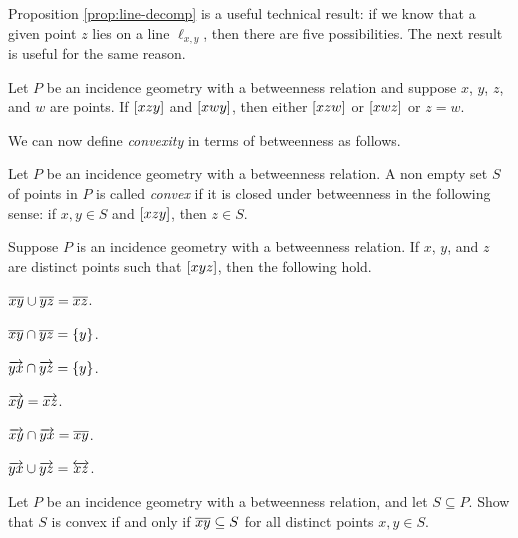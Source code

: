 Proposition \ref{prop:line-decomp} is a useful technical result: if we know that a given point \(z\) lies on a line \(\ell_{x,y}\), then there are five possibilities.
The next result is useful for the same reason.

\begin{prop}
Let \(P\) be an incidence geometry with a betweenness relation and suppose \(x\), \(y\), \(z\), and \(w\) are points.
If \([ x z y ]\) and \([ x w y ]\), then either \([ x z w ]\) or \([ x w z ]\) or \(z = w\).
\end{prop}

We can now define \emph{convexity} in terms of betweenness as follows.

\begin{dfn}[Convexity]
Let \(P\) be an incidence geometry with a betweenness relation.
A non empty set \(S\) of points in \(P\) is called \emph{convex} if it is closed under betweenness in the following sense: if \(x,y \in S\) and \([ x z y ]\), then \(z \in S\).
\end{dfn}



\Exercises%

\begin{exercise}
Suppose \(P\) is an incidence geometry with a betweenness relation.
If \(x\), \(y\), and \(z\) are distinct points such that \([ x y z ]\), then the following hold.
\begin{proplist}
\item \(\overline{xy} \cup \overline{yz} = \overline{xz}\).
\item \(\overline{xy} \cap \overline{yz} = \{y\}\).
\item \(\overrightarrow{yx} \cap \overrightarrow{yz} = \{y\}\).
\item \(\overrightarrow{xy} = \overrightarrow{xz}\).
\item \(\overrightarrow{xy} \cap \overrightarrow{yx} = \overline{xy}\).
\item \(\overrightarrow{yx} \cup \overrightarrow{yz} = \overleftrightarrow{xz}\).
\end{proplist}
\end{exercise}

\begin{exercise}
Let \(P\) be an incidence geometry with a betweenness relation, and let \(S \subseteq P\).
Show that \(S\) is convex if and only if \(\overline{xy} \subseteq S\) for all distinct points \(x,y \in S\).
\end{exercise}

